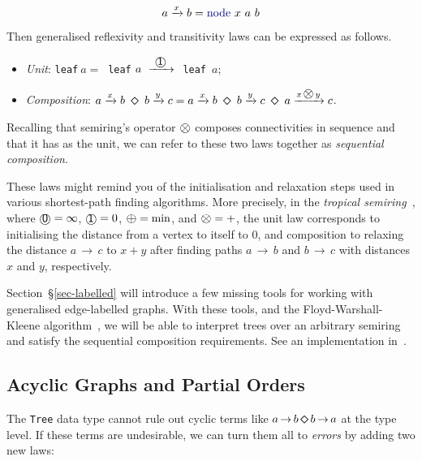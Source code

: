 \documentclass[crc,english]{programming}
\newcommand{\hcode}[1]{{\color{darkblue} \lstinline[keywordstyle={}]|#1|}} %
\newcommand{\add}{\text{\raisebox{-0.1mm}{\large $\oplus$}}}
\newcommand{\mul}{\text{\raisebox{-0.1mm}{\large $\otimes$}}}
\newcommand{\zero}{\raisebox{-0.2mm}{\textcircled{\textsf{0}}}\xspace}
\newcommand{\one}{\raisebox{-0.2mm}{\textcircled{\textsf{\hspace{-0.2mm}1}}}\xspace}
\newcommand{\dia}{\,\text{\raisebox{-0.3mm}{\Large $\diamond$}}\,}
\newcommand{\arr}{\,\text{$\rightarrow$}\,}
\begin{document}
\vspace{-5mm}
\begin{equation*}
a \xrightarrow{x} b = \text{\hcode{node}}\ x\ a\ b
\end{equation*}
\vspace{-5mm}

\noindent
Then generalised reflexivity and transitivity laws can be expressed as follows.

\begin{itemize}
    \item \emph{Unit}:
    \hcode{leaf}$~a =~$\hcode{leaf}$~a\ \xrightarrow{\ \one\ }\ $\hcode{leaf}~$a$;
    \item \emph{Composition}:
    $a \xrightarrow{x} b\ \dia\ b \xrightarrow{y} c = a \xrightarrow{x} b\ \dia\ b \xrightarrow{y} c\ \dia\ a \xrightarrow{x\,\mul\,y} c$.
\end{itemize}

\noindent
Recalling that semiring's operator $\mul$ composes connectivities in
sequence and that it has \one as the unit, we can refer to these two laws
together as \emph{sequential composition}.

These laws might remind you of the initialisation and relaxation steps used in
various shortest-path finding algorithms. More precisely, in the
\emph{tropical semiring}~\cite{mohri2002semiring}, where $\zero = \infty$,
$\one = 0$, $\add = \min$, and $\mul = +$, the unit law corresponds to
initialising the distance from a vertex to itself to $0$, and composition to
relaxing the distance $a \arr c$ to $x + y$ after finding paths $a \arr b$ and
$b \arr c$ with distances $x$ and $y$, respectively.

Section~\S\ref{sec-labelled} will introduce a few missing tools for working with
generalised edge-labelled graphs. With these tools, and the Floyd-Warshall-Kleene
algorithm~\cite{hopcroft_ullman}\cite{kleene1951representation}, we will be able
to interpret trees over an arbitrary semiring and satisfy the sequential
composition requirements. See an implementation
in~\cite{alga_haskell}.

\subsection{Acyclic Graphs and Partial Orders}\label{sec-acyclic-graphs}
\vspace{-1mm}

The \hcode{Tree} data type cannot rule out cyclic terms like
$a \arr b \dia b \arr a$ at the type level. If these terms are undesirable, we
can turn them all to \emph{errors} by adding two new laws:
\end{document}
